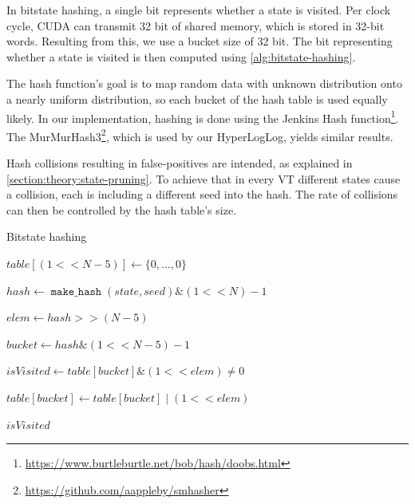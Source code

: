 \documentclass[
fancyheadings, %
%
%
]{stsreprt}
\DeclareMathOperator{\markVisited}{\texttt{mark\_visited}}
\DeclareMathOperator{\makeHash}{\texttt{make\_hash}}
\newcommand{\bitwiseAnd}{\mathbin{\text{\&}}}
\newcommand{\bitwiseOr}{\mathbin{\text{|}}}
\begin{document}
In bitstate hashing, a single bit represents whether a state is visited.
Per clock cycle, CUDA can transmit 32 bit of shared memory, which is stored in 32-bit words.
Resulting from this, we use a bucket size of 32 bit.
The bit representing whether a state is visited is then computed using \cref{alg:bitstate-hashing}.

The hash function's goal is to map random data with unknown distribution onto a nearly uniform distribution, so each bucket of the hash table is used equally likely.
In our implementation, hashing is done using the Jenkins Hash function\footnote{\url{https://www.burtleburtle.net/bob/hash/doobs.html}}.
The MurMurHash3\footnote{\url{https://github.com/aappleby/smhasher}}, which is used by our HyperLogLog, yields similar results.

Hash collisions resulting in false-positives are intended, as explained in \cref{section:theory:state-pruning}.
To achieve that in every VT different states cause a collision, each is including a different seed into the hash.
The rate of collisions can then be controlled by the hash table's size.

\begin{algorithm}
    \caption{Bitstate hashing}
    \label{alg:bitstate-hashing}
    \begin{algorithmic}
        \State $table[(1 << N - 5)] \gets \{0, \dots, 0\}$

        \Statex

        \Function{$\markVisited$}{state}
        \State $hash \gets \makeHash(state, seed) \bitwiseAnd (1 << N) - 1$

        \State $elem \gets hash >> (N - 5)$

        \State $bucket \gets hash \bitwiseAnd (1 << N - 5) - 1$

        \State $isVisited \gets table[bucket] \bitwiseAnd (1 << elem) \neq 0$

        \State $table[bucket] \gets table[bucket] \bitwiseOr (1 << elem)$

        \Statex

        \State \Return $isVisited$
        \EndFunction
    \end{algorithmic}
\end{algorithm}
\end{document}
